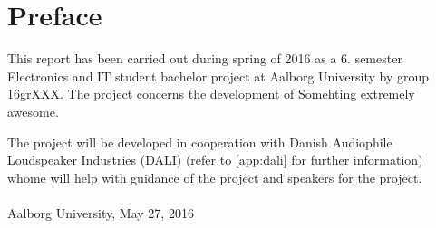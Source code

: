 \chapter*{Preface}\label{ch:forord}%
This report has been carried out during spring of 2016 as a 6. semester Electronics and IT student bachelor project at Aalborg University by group 16grXXX. The project concerns the development of Somehting extremely awesome.

The project will be developed in cooperation with Danish Audiophile Loudspeaker Industries (DALI) (refer to \autoref{app:dali} for further information) whome will help with guidance of the project and speakers for the project.   
\\\\

\vspace{0.5\baselineskip}\hfill Aalborg University, May 27, 2016

